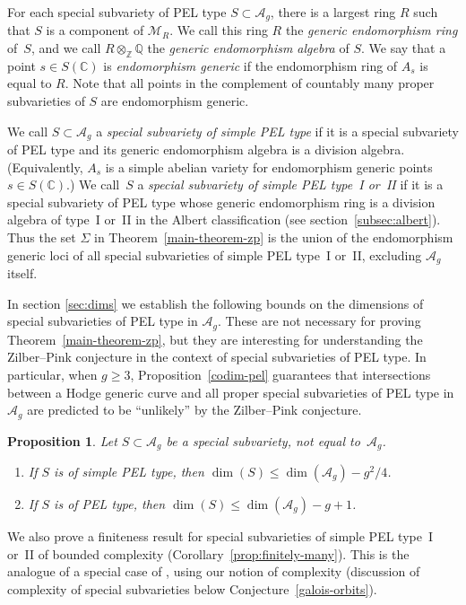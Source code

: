 \documentclass[JEP,XML,SOM,Unicode,NoFloatCountersInSection]{cedram}
\newenvironment{enumeratei}
{\bgroup\def\theenumi{\roman{enumi}}\def\theenumii{\alph{enumii}}\begin{enumerate}}
{\end{enumerate}\egroup}
\newcommand{\bC}{\mathbb{C}}
\newcommand{\bQ}{\mathbb{Q}}
\newcommand{\bZ}{\mathbb{Z}}
\newcommand{\cM}{\mathcal{M}}
\newcommand{\Ag}{\mathcal{A}_g}
\newcommand{\defterm}[1]{\emph{#1}}
\newtheorem{proposition}[lemma]{Proposition}
\begin{document}
For each special subvariety of PEL type $S \subset \Ag$, there is a largest ring $R$ such that $S$ is a component of $\cM_R$.
We call this ring $R$ the \defterm{generic endomorphism ring} of~$S$, and we call $R \otimes_\bZ \bQ$ the \defterm{generic endomorphism algebra} of $S$.
We say that a point $s\in S(\bC)$ is \defterm{endomorphism generic} if the endomorphism ring of $A_s$ is equal to $R$. Note that all points in the complement of countably many proper subvarieties of $S$ are endomorphism generic.

We call $S \subset \Ag$ a \defterm{special subvariety of simple PEL type} if it is a special subvariety of PEL type and its generic endomorphism algebra is a division algebra.
(Equivalently, $A_s$ is a simple abelian variety for endomorphism generic points $s \in S(\bC)$.)
We call~$S$ a \defterm{special subvariety of simple PEL type~I or~II} if it is a special subvariety of PEL type whose generic endomorphism ring is a division algebra of type~I or~II in the Albert classification (see section~\ref{subsec:albert}).
Thus the set $\Sigma$ in Theorem~\ref{main-theorem-zp} is the union of the endomorphism generic loci of all special subvarieties of simple PEL type~I or~II, excluding $\Ag$ itself.

In section \ref{sec:dims} we establish the following bounds on the dimensions of special subvarieties of PEL type in $\Ag$. These are not necessary for proving Theorem~\ref{main-theorem-zp}, but they are interesting for understanding the Zilber--Pink conjecture in the context of special subvarieties of PEL type.
In particular, when $g \geq 3$, Proposition~\ref{codim-pel} guarantees that intersections between a Hodge generic curve and all proper special subvarieties of PEL type in $\Ag$ are predicted to be ``unlikely'' by the Zilber--Pink conjecture.

\begin{proposition}\label{codim-pel-intro}
Let $S \subset \Ag$ be a special subvariety, not equal to~$\Ag$.
\begin{enumeratei}
\item\label{codim-pel-introi} If $S$ is of simple PEL type, then $\dim(S) \leq \dim(\Ag) - g^2/4$.
\item\label{codim-pel-introii} If $S$ is of PEL type, then $\dim(S) \leq \dim(\Ag) - g + 1$.
\end{enumeratei}
\end{proposition}

We also prove a finiteness result for special subvarieties of simple PEL type~I or~II of bounded complexity (Corollary~\ref{prop:finitely-many}).
This is the analogue of a special case of \cite[Conj.\,10.3]{DR18}, using our notion of complexity (\cf discussion of complexity of special subvarieties below Conjecture~\ref{galois-orbits}).
\end{document}
